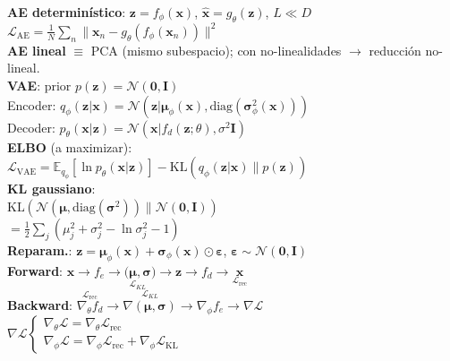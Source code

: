 \documentclass[10pt, a4paper]{article}
\newcommand{\x}{\mathbf{x}}
\newcommand{\z}{\mathbf{z}}
\newcommand{\Loss}{\mathcal{L}}
\newcommand{\muu}{\boldsymbol{\mu}}
\begin{document}
\begin{minipage}[t]{0.3299\textwidth}
\begin{tcolorbox}[formulabox=Autoencoders, colframe=softRed]
    \textbf{AE determinístico}: $\z=f_\phi(\x)$, $\hat{\x}=g_\theta(\z)$, $L\ll D$\\
    $\Loss_\text{AE} = \tfrac{1}{N}\sum_n\|\x_n - g_\theta(f_\phi(\x_n))\|^2$\\
    \textbf{AE lineal} $\equiv$ PCA (mismo subespacio); con no-linealidades $\to$ reducción no-lineal.\\[2pt]
    \vspace{-2mm}
    \tcbline
    \vspace{-2mm}
    \textbf{VAE}: prior $p(\z)=\mathcal{N}(\mathbf{0},\mathbf{I})$\\
    Encoder: $q_\phi(\z|\x)=\mathcal{N}(\z|\muu_\phi(\x),\text{diag}(\boldsymbol{\sigma}^2_\phi(\x)))$\\
    Decoder: $p_\theta(\x |\z)=\mathcal{N}(\x |f_d(\z;\theta), \sigma^2\mathbf{I})$\\[2pt]
    \textbf{ELBO} (a maximizar):\\
    $\Loss_\text{VAE} = \mathbb{E}_{q_\phi}[\ln p_\theta(\x|\z)] - \text{KL}(q_\phi(\z|\x)\|p(\z))$\\
    \textbf{KL gaussiano}:\\
    $\text{KL}(\mathcal{N}(\muu,\text{diag}(\boldsymbol{\sigma}^2))\|\mathcal{N}(\mathbf{0},\mathbf{I}))$\\
    $= \tfrac{1}{2}\sum_j(\mu_j^2+\sigma_j^2-\ln\sigma_j^2-1)$\\[2pt]
    \textbf{Reparam.}: $\z=\muu_\phi(\x)+\boldsymbol{\sigma}_\phi(\x)\odot\boldsymbol{\varepsilon}$, $\boldsymbol{\varepsilon}\sim\mathcal{N}(\mathbf{0},\mathbf{I})$\\
    \textbf{Forward}: $\x\to f_e\to \underset{\Loss_{KL}}{(\muu,\boldsymbol{\sigma}})\to\z\to f_d \to \underset{\Loss_\text{rec}}{\hat{\x}}$\\
    \textbf{Backward}: $\overset{\Loss_\text{rec}}{\nabla_\theta f_d} \to \overset{\Loss_{KL}}{\nabla(\muu,\boldsymbol{\sigma})}\to \nabla_\phi f_e \to \nabla \Loss$\\
    $\nabla \Loss \begin{cases}\nabla_\theta\Loss=\nabla_\theta\Loss_\text{rec} \\ \nabla_\phi\Loss=\nabla_\phi\Loss_\text{rec}+\nabla_\phi\Loss_\text{KL}\end{cases}$
\end{tcolorbox}


\end{minipage}
\end{document}
